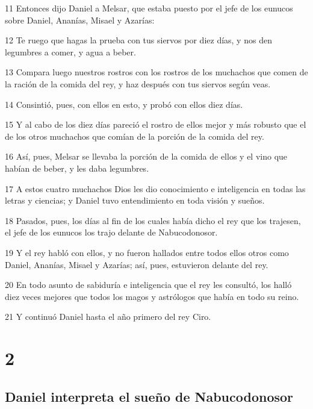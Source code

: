 \par 11 Entonces dijo Daniel a Melsar, que estaba puesto por el jefe de los eunucos sobre Daniel, Ananías, Misael y Azarías:
\par 12 Te ruego que hagas la prueba con tus siervos por diez días, y nos den legumbres a comer, y agua a beber.
\par 13 Compara luego nuestros rostros con los rostros de los muchachos que comen de la ración de la comida del rey, y haz después con tus siervos según veas.
\par 14 Consintió, pues, con ellos en esto, y probó con ellos diez días.
\par 15 Y al cabo de los diez días pareció el rostro de ellos mejor y más robusto que el de los otros muchachos que comían de la porción de la comida del rey.
\par 16 Así, pues, Melsar se llevaba la porción de la comida de ellos y el vino que habían de beber, y les daba legumbres.
\par 17 A estos cuatro muchachos Dios les dio conocimiento e inteligencia en todas las letras y ciencias; y Daniel tuvo entendimiento en toda visión y sueños. 
\par 18 Pasados, pues, los días al fin de los cuales había dicho el rey que los trajesen, el jefe de los eunucos los trajo delante de Nabucodonosor.
\par 19 Y el rey habló con ellos, y no fueron hallados entre todos ellos otros como Daniel, Ananías, Misael y Azarías; así, pues, estuvieron delante del rey.
\par 20 En todo asunto de sabiduría e inteligencia que el rey les consultó, los halló diez veces mejores que todos los magos y astrólogos que había en todo su reino.
\par 21 Y continuó Daniel hasta el año primero del rey Ciro.

\chapter{2}

\section*{Daniel interpreta el sueño de Nabucodonosor}

